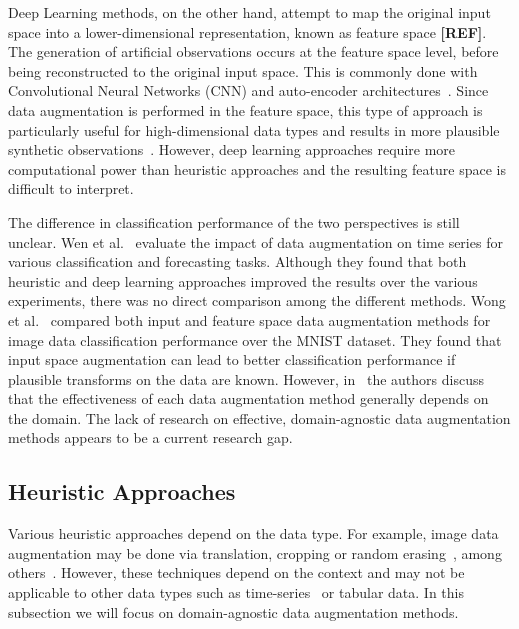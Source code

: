 \documentclass[parskip=full]{scrartcl}
\begin{document}
Deep Learning methods, on the other hand, attempt to map the original input
space into a lower-dimensional representation, known as feature space
\textbf{[REF]}. The generation of artificial observations occurs at the
feature space level, before being reconstructed to the original input space.
This is commonly done with Convolutional Neural Networks (CNN) and
auto-encoder architectures~\cite{Shorten2019}. Since data augmentation is
performed in the feature space, this type of approach is particularly useful
for high-dimensional data types and results in more plausible synthetic
observations~\cite{DeVries2017}. However, deep learning approaches require
more computational power than heuristic approaches and the resulting feature
space is difficult to interpret.

The difference in classification performance of the two perspectives is still
unclear. Wen et al.~\cite{Wen2020} evaluate the impact of data augmentation on
time series for various classification and forecasting tasks. Although they
found that both heuristic and deep learning approaches improved the results
over the various experiments, there was no direct comparison among the
different methods. Wong et al.~\cite{Wong2016} compared both input and feature
space data augmentation methods for image data classification performance over
the MNIST dataset. They found that input space augmentation can lead to better
classification performance if plausible transforms on the data are known.
However, in~\cite{DeVries2017} the authors discuss that the effectiveness of
each data augmentation method generally depends on the domain. The lack of
research on effective, domain-agnostic data augmentation methods appears to be
a current research gap.

 
\subsection{Heuristic Approaches}

Various heuristic approaches depend on the data type. For example, image data
augmentation may be done via translation, cropping or random
erasing~\cite{Zhong2017}, among others~\cite{Shorten2019}. However, these
techniques depend on the context and may not be applicable to other data types
such as time-series~\cite{Wen2020, Iwana2021} or tabular data. In this
subsection we will focus on domain-agnostic data augmentation methods.
\end{document}
